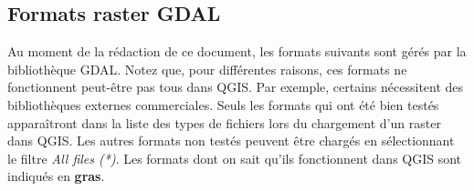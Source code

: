 \subsection{Formats raster GDAL}\label{appdx_gdal}

Au moment de la r\'edaction de ce document, les formats suivants sont g\'er\'es par la biblioth\`eque GDAL. Notez que, pour diff\'erentes raisons, ces formats ne fonctionnent peut-\^etre pas tous dans QGIS. Par exemple, certains n\'ecessitent des biblioth\`eques externes commerciales. Seuls les formats qui ont \'et\'e bien test\'es appara\^itront dans la liste des types de fichiers lors du chargement d'un raster dans QGIS. Les autres formats non test\'es peuvent \^etre charg\'es en s\'electionnant le filtre \textsl{All files (*)}. Les formats dont on sait qu'ils fonctionnent dans QGIS sont indiqu\'es en \textbf{gras}.

